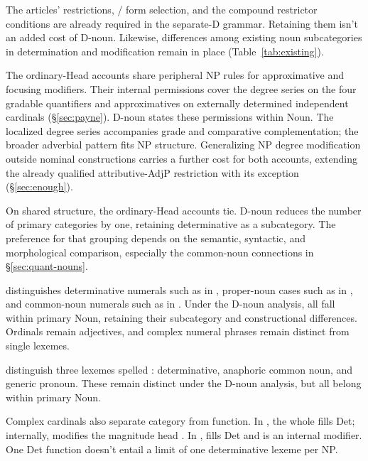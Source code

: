 \documentclass[12pt]{article}
\begin{document}
The articles' restrictions, / form selection, and the compound restrictor conditions are already required in the separate-D grammar. Retaining them isn't an added cost of D-noun. Likewise, differences among existing noun subcategories in determination and modification remain in place (Table~\ref{tab:existing}).

The ordinary-Head accounts share peripheral NP rules for approximative and focusing modifiers. Their internal permissions cover the degree series on the four gradable quantifiers and approximatives on externally determined independent cardinals (§\ref{sec:payne}). D-noun states these permissions within Noun. The localized degree series accompanies grade and comparative complementation; the broader adverbial pattern fits NP structure. Generalizing NP degree modification outside nominal constructions carries a further cost for both accounts, extending the already qualified attributive-AdjP restriction with its  exception (§\ref{sec:enough}).

On shared structure, the ordinary-Head accounts tie. D-noun reduces the number of primary categories by one, retaining determinative as a subcategory. The preference for that grouping depends on the semantic, syntactic, and morphological comparison, especially the common-noun connections in §\ref{sec:quant-nouns}.

\textcite{reynolds2026numerals} distinguishes determinative numerals such as  in , proper-noun cases such as  in , and common-noun numerals such as  in . Under the D-noun analysis, all fall within primary Noun, retaining their subcategory and constructional differences. Ordinals remain adjectives, and complex numeral phrases remain distinct from single lexemes.

\textcite[797--798]{payne2013anaphoric} distinguish three lexemes spelled : determinative, anaphoric common noun, and generic pronoun. These remain distinct under the D-noun analysis, but all belong within primary Noun.

Complex cardinals also separate category from function. In , the whole  fills Det; internally,  modifies the magnitude head  \citep[§4]{reynolds2026numerals}. In ,  fills Det and  is an internal modifier. One Det function doesn't entail a limit of one determinative lexeme per NP.
\end{document}
